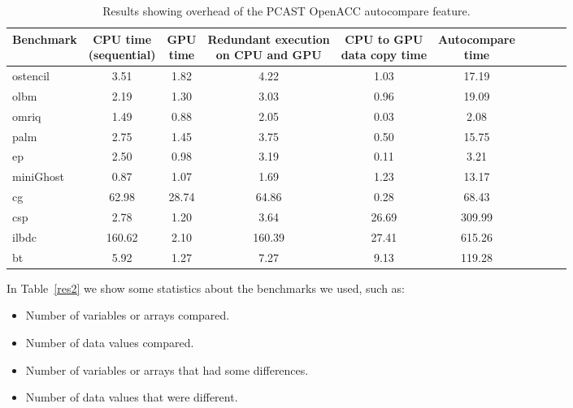 \begin{table}
\begin{center}
\begin{tabular}{|l|c|c|c|c|c|c|c|c|c|}
\hline

Benchmark & \parbox[c]{1.9 cm}{\centering CPU time \\(sequential)} &  \parbox[c]{1 cm}{\centering GPU \\ time} & \parbox[c]{3.5 cm}{\centering Redundant execution \\ on CPU and GPU} & \parbox[c]{2.75 cm}{\centering CPU to GPU \\  data copy time} &  \parbox[c]{2 cm}{\centering Autocompare \\   time} \\



\hline

ostencil  & 3.51 & 1.82 & 4.22 & 1.03 & 17.19\\
olbm      & 2.19 & 1.30 & 3.03 & 0.96 & 19.09 \\
omriq     & 1.49 & 0.88 & 2.05 & 0.03 & 2.08\\
palm      & 2.75 & 1.45 & 3.75 & 0.50 & 15.75\\
ep        & 2.50 & 0.98 & 3.19 & 0.11 & 3.21\\
miniGhost & 0.87 & 1.07 & 1.69 & 1.23 & 13.17\\
cg        & 62.98 & 28.74 & 64.86 & 0.28 & 68.43\\
csp       & 2.78 & 1.20	& 3.64 & 26.69 & 309.99\\
ilbdc     & 160.62 & 2.10 & 160.39 & 27.41 & 615.26\\
bt        & 5.92 & 1.27 & 7.27 & 9.13 & 119.28\\

            
\hline
\end{tabular}
\end{center}
\caption{Results showing overhead of the PCAST OpenACC autocompare feature.}
\label{res1}
\end{table}


In Table~\ref{res2} 
we show some statistics about the benchmarks we used, such as:
\begin{itemize}
\item Number of variables or arrays compared.
\item Number of data values compared.
\item Number of variables or arrays that had some differences.
\item Number of data values that were different.
\end{itemize}




